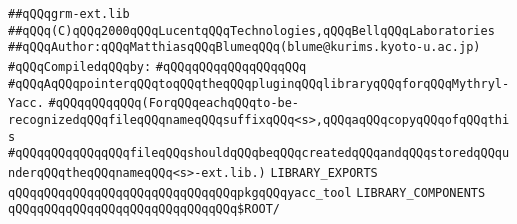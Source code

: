 \label{src/app/makelib/tools/mlyacc/grm-ext.lib}
\verb|##qQQqgrm-ext.lib|\newline
\verb|##qQQq(C)qQQq2000qQQqLucentqQQqTechnologies,qQQqBellqQQqLaboratories|\newline
\verb|##qQQqAuthor:qQQqMatthiasqQQqBlumeqQQq(blume@kurims.kyoto-u.ac.jp)|\newline
\newline
\verb|#qQQqCompiledqQQqby:|\newline
\verb|#qQQqqQQqqQQqqQQqqQQq|\newline
\newline
\newline
\newline
\verb|#qQQqAqQQqpointerqQQqtoqQQqtheqQQqpluginqQQqlibraryqQQqforqQQqMythryl-Yacc.|\newline
\verb|#qQQqqQQqqQQq(ForqQQqeachqQQqto-be-recognizedqQQqfileqQQqnameqQQqsuffixqQQq<s>,qQQqaqQQqcopyqQQqofqQQqthis|\newline
\verb|#qQQqqQQqqQQqqQQqfileqQQqshouldqQQqbeqQQqcreatedqQQqandqQQqstoredqQQqunderqQQqtheqQQqnameqQQq<s>-ext.lib.)|\newline
\newline
\newline
\newline
\newline
\verb|LIBRARY_EXPORTS|\newline
\newline
\verb|qQQqqQQqqQQqqQQqqQQqqQQqqQQqqQQqpkgqQQqyacc_tool|\newline
\newline
\newline
\newline
\verb|LIBRARY_COMPONENTS|\newline
\newline
\verb|qQQqqQQqqQQqqQQqqQQqqQQqqQQqqQQq$ROOT/|\newline

